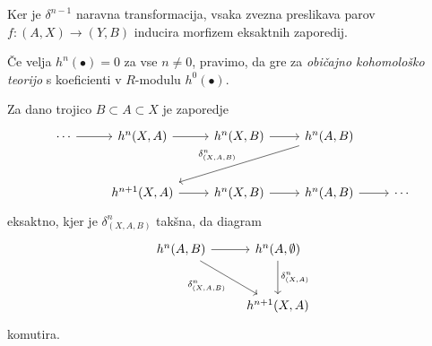 \begin{opomba}
Ker je $\delta^{n-1}$ naravna transformacija, vsaka zvezna
preslikava parov $f \colon (A, X) \to (Y, B)$ inducira morfizem
eksaktnih zaporedij.
\end{opomba}

\begin{definicija}
Če velja $h^n(\bullet) = 0$ za vse $n \ne 0$, pravimo, da gre za
\emph{običajno kohomološko teorijo}
s koeficienti v $R$-modulu $h^0(\bullet)$.
\end{definicija}

\begin{izrek}
Za dano trojico $B \subset A \subset X$ je zaporedje
\[
\begin{tikzcd}[row sep=large]
\cdots \arrow[r] &
h^n(X, A) \arrow[r] &
h^n(X, B) \arrow[r] &
h^n(A, B) \arrow[dll, "\delta_{(X,A,B)}^n"']
\\ &
h^{n+1}(X,A) \arrow[r] &
h^n(X, B) \arrow[r] &
h^n(A, B) \arrow[r] &
\cdots
\end{tikzcd}
\]
eksaktno, kjer je $\delta_{(X,A,B)}^n$ takšna, da diagram
\[
\begin{tikzcd}[row sep=large]
h^n(A,B) \arrow[r] \arrow[dr, "\delta_{(X,A,B)}^n"'] &
h^n(A, \emptyset) \arrow[d, "\delta_{(X,A)}^n"] \\ &
h^{n+1}(X,A)
\end{tikzcd}
\]
komutira.
\end{izrek}

